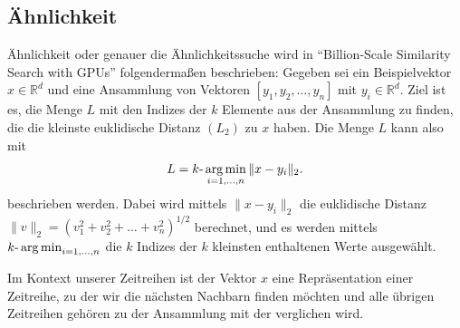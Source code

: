 \subsection{Ähnlichkeit}
Ähnlichkeit oder genauer die Ähnlichkeitssuche wird in "`Billion-Scale Similarity Search with GPUs"' \cite[Ch. 2]{jmh2019} folgendermaßen beschrieben: Gegeben sei ein Beispielvektor $x \in \mathbb{R}^d$ und eine Ansammlung von Vektoren $[y_1,y_2,\ldots,y_n]$ mit $y_i \in \mathbb{R}^d$. Ziel ist es, die Menge $L$ mit den Indizes der $k$ Elemente aus der Ansammlung zu finden, die die kleinste euklidische Distanz $(L_2)$ zu $x$ haben. Die Menge $L$ kann also mit
\begin{equation}
  L= k \text{-} \operatorname*{arg\,min}_{i=1,\ldots,n}\|x-y_i\|_2.
\end{equation}
beschrieben werden. Dabei wird mittels $\|x-y_i\|_2$ die euklidische Distanz \\ $\|v\|_2 = (v_1^2+v_2^2+ \ldots +v_n^2)^{1/2}$ berechnet, und es werden mittels $k\text{-}\operatorname*{arg\,min}_{i=1,\ldots,n}$ die $k$ Indizes der $k$ kleinsten enthaltenen Werte ausgewählt.

Im Kontext unserer Zeitreihen ist der Vektor $x$ eine Repräsentation einer Zeitreihe, zu der wir die nächsten Nachbarn finden möchten und alle übrigen Zeitreihen gehören zu der Ansammlung mit der verglichen wird.